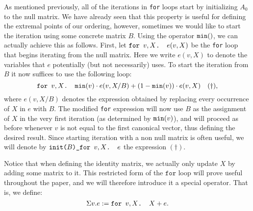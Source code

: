 As mentioned previously, all of the iterations in \texttt{for} loops start by initializing $A_0$ to the null matrix. We have already seen that this property is useful for defining the extremal points of our ordering, however, sometimes we would like to start the iteration using some concrete matrix $B$. Using the operator $\mmin$, we can actually achieve this as follows. First, let $\texttt{for }v,X \texttt{. }e(v,X)$ be the \texttt{for} loop that begins iterating from the null matrix. Here we write $e(v,X)$ to denote the variables that $e$ potentially (but not necessarily) uses. To start the iteration from $B$ it now suffices to use the following loop:
$$\texttt{for }v,X \texttt{. }\texttt{min}(v)\cdot e(v,X/B) + (1-\texttt{min}(v))\cdot e(v,X) \quad (\dag),$$
where $e(v,X/B)$ denotes the expression obtained by replacing every occurrence of $X$ in $e$ with $B$. The modified \texttt{for} expression will now use $B$ as the assignment of $X$ in the very first iteration (as determined by $\texttt{min}(v)$), and will proceed as before whenever $v$ is not equal to the first canonical vector, thus defining the desired result. Since starting iteration with a non null matrix is often useful, we will denote  by $\texttt{init(}B\texttt{)\_}\texttt{for }v,X \texttt{. }e$ the expression $(\dag)$.

\medskip

 Notice that when defining the identity matrix, we actually only update $X$ by adding some matrix to it. This restricted form of the $\texttt{for}$ loop will prove useful throughout the paper, and we will therefore introduce it a special operator. That is, we define:
$$\Sigma v. e := \texttt{for }v,X \texttt{. }X + e.$$

